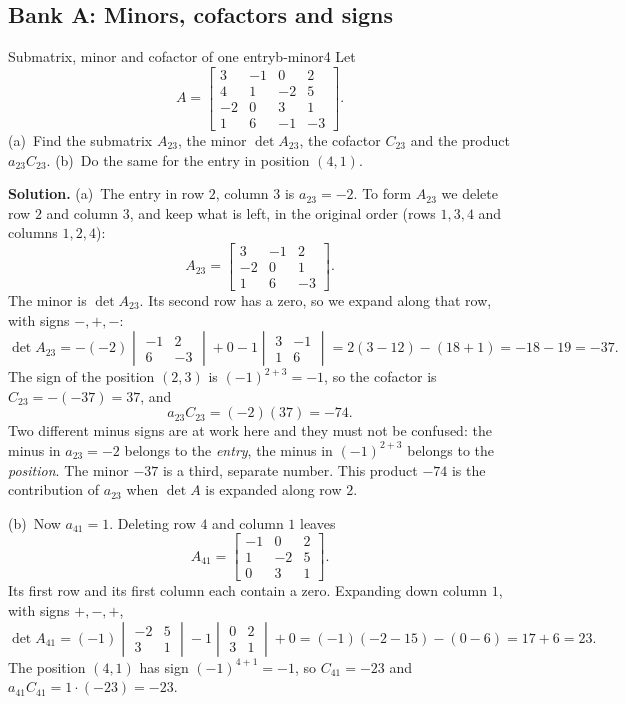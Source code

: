 \documentclass[11pt]{article}
\begin{document}
\subsection*{Bank A: Minors, cofactors and signs}

\begin{exmp}{Submatrix, minor and cofactor of one entry}{b-minor4}
Let
\[
A=\begin{bmatrix}3&-1&0&2\\4&1&-2&5\\-2&0&3&1\\1&6&-1&-3\end{bmatrix}.
\]
(a)~Find the submatrix $A_{23}$, the minor $\det A_{23}$, the cofactor $C_{23}$ and the product $a_{23}C_{23}$. (b)~Do the same for the entry in position $(4,1)$.

\textbf{Solution.} (a)~The entry in row $2$, column $3$ is $a_{23}=-2$. To form $A_{23}$ we delete row $2$ and column $3$, and keep what is left, in the original order (rows $1,3,4$ and columns $1,2,4$):
\[
A_{23}=\begin{bmatrix}3&-1&2\\-2&0&1\\1&6&-3\end{bmatrix}.
\]
The minor is $\det A_{23}$. Its second row has a zero, so we expand along that row, with signs $-,+,-$:
\[
\det A_{23}=-(-2)\begin{vmatrix}-1&2\\6&-3\end{vmatrix}+0-1\begin{vmatrix}3&-1\\1&6\end{vmatrix}=2(3-12)-(18+1)=-18-19=-37.
\]
The sign of the position $(2,3)$ is $(-1)^{2+3}=-1$, so the cofactor is $C_{23}=-(-37)=37$, and
\[
a_{23}C_{23}=(-2)(37)=-74.
\]
Two different minus signs are at work here and they must not be confused: the minus in $a_{23}=-2$ belongs to the \emph{entry}, the minus in $(-1)^{2+3}$ belongs to the \emph{position}. The minor $-37$ is a third, separate number. This product $-74$ is the contribution of $a_{23}$ when $\det A$ is expanded along row $2$.

(b)~Now $a_{41}=1$. Deleting row $4$ and column $1$ leaves
\[
A_{41}=\begin{bmatrix}-1&0&2\\1&-2&5\\0&3&1\end{bmatrix}.
\]
Its first row and its first column each contain a zero. Expanding down column $1$, with signs $+,-,+$,
\[
\det A_{41}=(-1)\begin{vmatrix}-2&5\\3&1\end{vmatrix}-1\begin{vmatrix}0&2\\3&1\end{vmatrix}+0=(-1)(-2-15)-(0-6)=17+6=23.
\]
The position $(4,1)$ has sign $(-1)^{4+1}=-1$, so $C_{41}=-23$ and $a_{41}C_{41}=1\cdot(-23)=-23$.
\end{exmp}
\end{document}
